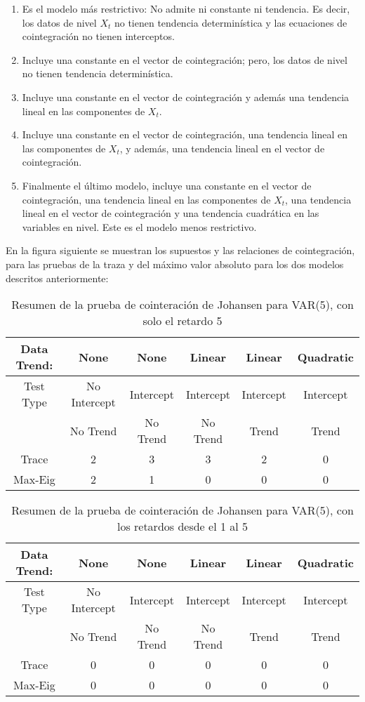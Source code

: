 \begin{enumerate}
      \item Es el modelo m\'{a}s restrictivo: No admite ni constante ni tendencia. Es decir, los datos de nivel $X_{t}$ no tienen tendencia determin\'{i}stica y las ecuaciones de cointegraci\'{o}n no tienen interceptos.
      \item Incluye una constante en el vector de cointegraci\'{o}n; pero, los datos de nivel no tienen tendencia determin\'{i}stica.
      \item Incluye una constante en el vector de cointegraci\'{o}n y adem\'{a}s una tendencia lineal en las componentes de $X_{t}$.
      \item Incluye una constante en el vector de cointegraci\'{o}n, una tendencia lineal en las componentes de $X_{t}$, y adem\'{a}s, una tendencia lineal en el vector de cointegraci\'{o}n.
      \item Finalmente el \'{u}ltimo modelo, incluye una constante en el vector de cointegraci\'{o}n, una tendencia lineal en las componentes de $X_{t}$, una tendencia lineal en el vector de cointegraci\'{o}n y una tendencia cuadr\'{a}tica en las variables en nivel. Este es el modelo menos restrictivo.
\end{enumerate}

En la figura siguiente se muestran los supuestos y las relaciones de cointegraci\'{o}n, para las pruebas de la traza y del m\'{a}ximo valor absoluto para los dos modelos descritos anteriormente:

\begin{table}[H]
\centering
\begin{tabular}{|c|c|c|c|c|c|}\hline\hline
Data Trend: & None & None & Linear & Linear & Quadratic \\ \hline
Test Type & No Intercept & Intercept & Intercept & Intercept & Intercept \\
 & No Trend & No Trend & No Trend & Trend & Trend \\
Trace & 2 & 3 & 3 & 2 &  0 \\ 
Max-Eig & 2 & 1 & 0 & 0 & 0 \\ \hline\hline
\end{tabular}
\caption{Resumen de la prueba de cointeraci\'{o}n de Johansen para VAR(5), con solo el retardo 5}
\label{tab9}
\end{table}

\begin{table}[H]
\centering
\begin{tabular}{|c|c|c|c|c|c|}\hline\hline
Data Trend: & None & None & Linear & Linear & Quadratic \\ \hline
Test Type & No Intercept & Intercept & Intercept & Intercept & Intercept \\
 & No Trend & No Trend & No Trend & Trend & Trend \\
Trace & 0 & 0 & 0 & 0 &  0 \\ 
Max-Eig & 0 & 0 & 0 & 0 & 0 \\ \hline\hline
\end{tabular}
\caption{Resumen de la prueba de cointeraci\'{o}n de Johansen para VAR(5), con los retardos desde el 1 al 5}
\label{tab10}
\end{table}

